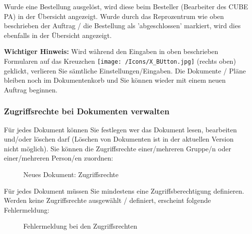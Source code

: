 \vspace{\baselineskip}

Wurde eine Bestellung ausgelöst, wird diese beim Besteller (Bearbeiter des CUBE PA) in der Übersicht angezeigt. Wurde durch das Reprozentrum wie oben beschrieben der Auftrag / die Bestellung als 'abgeschlossen' markiert, wird dies ebenfalls in der Übersicht angezeigt.

\vspace{\baselineskip}

\textbf{Wichtiger Hinweis:} Wird während den Eingaben in oben beschrieben Formularen auf das Kreuzchen \texttt{[image: /Icons/X\_BUtton.jpg]} (rechts oben) geklickt, verlieren Sie sämtliche Einstellungen/Eingaben. Die Dokumente / Pläne bleiben noch im Dokumentenkorb und Sie können wieder mit einem neuen Auftrag beginnen.

\subsubsection{Zugriffsrechte bei Dokumenten verwalten}
\label{bkm:Ref442869495}

Für jedes Dokument können Sie festlegen wer das Dokument lesen, bearbeiten und/oder löschen darf (Löschen von Dokumenten ist in der aktuellen Version nicht möglich). Sie können die Zugriffsrechte einer/mehreren Gruppe/n oder einer/mehreren Person/en zuordnen:

\begin{figure}[H]
\caption{Neues Dokument: Zugriffsrechte}
\end{figure}

Für jedes Dokument müssen Sie mindestens eine Zugriffsberechtigung definieren. Werden keine Zugriffsrechte ausgewählt / definiert, erscheint folgende Fehlermeldung:

\begin{figure}[H]
\caption{Fehlermeldung bei den Zugriffsrechten}
\end{figure}

